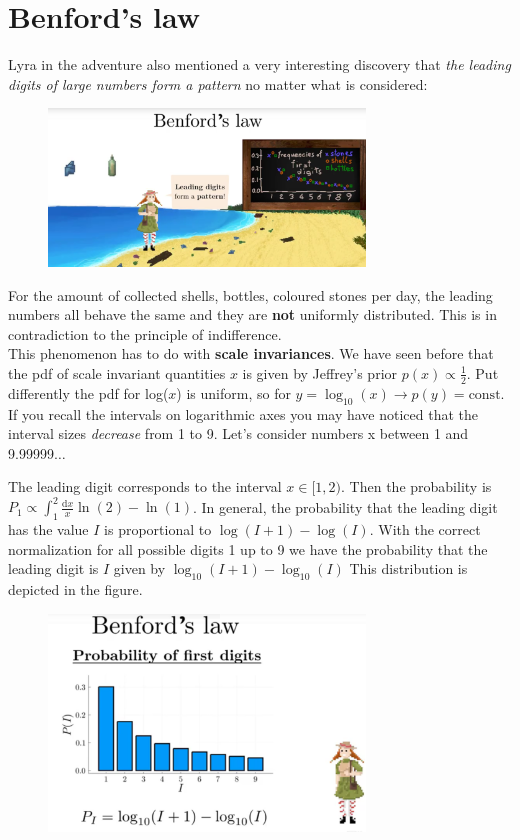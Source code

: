 \documentclass[12pt, a4paper]{scrartcl}
\begin{document}
\section*{Benford's law}
Lyra in the adventure also mentioned a very interesting discovery that \textit{the
leading digits of large numbers form a pattern} no matter what is considered: %
 \begin{figure}[H]
	\centering
	\includegraphics[width=0.75\textwidth]{8_14.png}
\end{figure}
For the amount of collected shells, bottles, coloured stones per day, the leading numbers all behave the same and
they are  \textbf{not} uniformly distributed. This is in contradiction to the principle
of indifference.\\
This phenomenon has to do with  \textbf{scale invariances}. We have seen before that
the pdf of scale invariant quantities $x$ is given by Jeffrey’s prior $p(x)\propto \frac 12$.
Put differently the pdf for log($x$) is uniform, so for $y=\log_{10}(x)\rightarrow p(y)= \text{const}$.
If you recall the intervals on logarithmic axes you may have noticed that the
interval sizes \textit{decrease} from 1 to 9. %
Let’s consider numbers x between 1 and 9.99999$\ldots$

The leading digit corresponds to the interval $x \in [1,2)$.
Then the probability is $P_1\propto \int_1^2\frac{\text{d}x}{x}\ln(2)-\ln(1)$.
In general, the probability that the leading digit has the value $I$ is proportional to $\log(I+1)-\log(I)$.
With the correct normalization for all possible digits 1 up to 9 we have the probability that the leading digit is $I$ given by $\log_{10}(I+1)-\log_{10}(I)$
This distribution is depicted in the figure.\\%
 \begin{figure}[H]
	\centering
	\includegraphics[width=0.75\textwidth]{8_15.png}
\end{figure}
\end{document}
